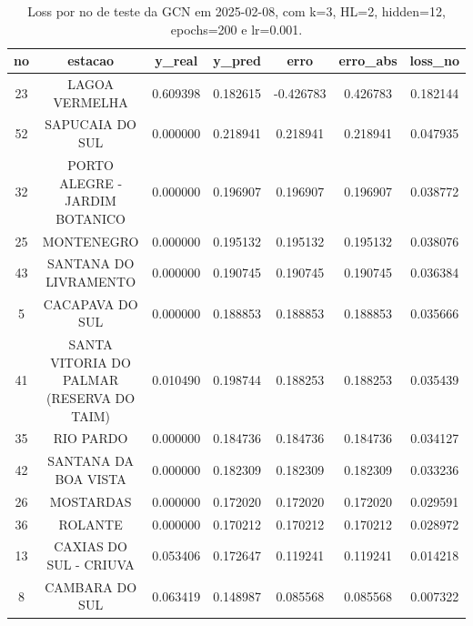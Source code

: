 \begin{table}[h]
\centering
\caption{Loss por no de teste da GCN em 2025-02-08, com k=3, HL=2, hidden=12, epochs=200 e lr=0.001.}
\label{tab:gcn_loss_k3_hl2_h12_e200_d20250208}
\begin{tabular}{ccccccc}
\toprule
no & estacao & y\_real & y\_pred & erro & erro\_abs & loss\_no \\
\midrule
23 & LAGOA VERMELHA & 0.609398 & 0.182615 & -0.426783 & 0.426783 & 0.182144 \\
52 & SAPUCAIA DO SUL & 0.000000 & 0.218941 & 0.218941 & 0.218941 & 0.047935 \\
32 & PORTO ALEGRE - JARDIM BOTANICO & 0.000000 & 0.196907 & 0.196907 & 0.196907 & 0.038772 \\
25 & MONTENEGRO & 0.000000 & 0.195132 & 0.195132 & 0.195132 & 0.038076 \\
43 & SANTANA DO LIVRAMENTO & 0.000000 & 0.190745 & 0.190745 & 0.190745 & 0.036384 \\
5 & CACAPAVA DO SUL & 0.000000 & 0.188853 & 0.188853 & 0.188853 & 0.035666 \\
41 & SANTA VITORIA DO PALMAR (RESERVA DO TAIM) & 0.010490 & 0.198744 & 0.188253 & 0.188253 & 0.035439 \\
35 & RIO PARDO & 0.000000 & 0.184736 & 0.184736 & 0.184736 & 0.034127 \\
42 & SANTANA DA BOA VISTA & 0.000000 & 0.182309 & 0.182309 & 0.182309 & 0.033236 \\
26 & MOSTARDAS & 0.000000 & 0.172020 & 0.172020 & 0.172020 & 0.029591 \\
36 & ROLANTE & 0.000000 & 0.170212 & 0.170212 & 0.170212 & 0.028972 \\
13 & CAXIAS DO SUL - CRIUVA & 0.053406 & 0.172647 & 0.119241 & 0.119241 & 0.014218 \\
8 & CAMBARA DO SUL & 0.063419 & 0.148987 & 0.085568 & 0.085568 & 0.007322 \\
\bottomrule
\end{tabular}
\end{table}
